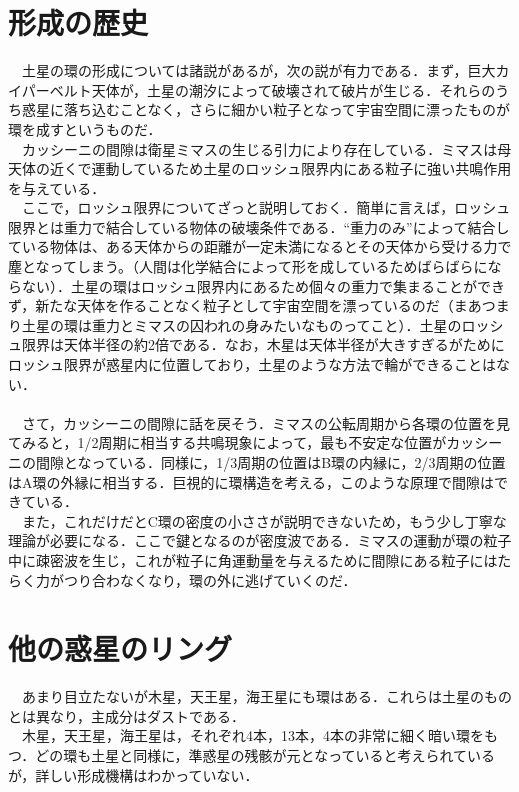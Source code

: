\documentclass[../main]{subfiles}
\begin{document}
\section{形成の歴史}
　土星の環の形成については諸説があるが，次の説が有力である．まず，巨大カイパーベルト天体が，土星の潮汐によって破壊されて破片が生じる．それらのうち惑星に落ち込むことなく，さらに細かい粒子となって宇宙空間に漂ったものが環を成すというものだ．\\
　カッシーニの間隙は衛星ミマスの生じる引力により存在している．ミマスは母天体の近くで運動しているため土星のロッシュ限界内にある粒子に強い共鳴作用を与えている．\\
　ここで，ロッシュ限界についてざっと説明しておく．簡単に言えば，ロッシュ限界とは重力で結合している物体の破壊条件である．``重力のみ''によって結合している物体は、ある天体からの距離が一定未満になるとその天体から受ける力で塵となってしまう。（人間は化学結合によって形を成しているためばらばらにならない）．土星の環はロッシュ限界内にあるため個々の重力で集まることができず，新たな天体を作ることなく粒子として宇宙空間を漂っているのだ（まあつまり土星の環は重力とミマスの囚われの身みたいなものってこと）．土星のロッシュ限界は天体半径の約2倍である．なお，木星は天体半径が大きすぎるがためにロッシュ限界が惑星内に位置しており，土星のような方法で輪ができることはない．
\\\\
　さて，カッシーニの間隙に話を戻そう．ミマスの公転周期から各環の位置を見てみると，1/2周期に相当する共鳴現象によって，最も不安定な位置がカッシーニの間隙となっている．同様に，1/3周期の位置はB環の内縁に，2/3周期の位置はA環の外縁に相当する．巨視的に環構造を考える，このような原理で間隙はできている．\\
　また，これだけだとC環の密度の小ささが説明できないため，もう少し丁寧な理論が必要になる．ここで鍵となるのが密度波である．ミマスの運動が環の粒子中に疎密波を生じ，これが粒子に角運動量を与えるために間隙にある粒子にはたらく力がつり合わなくなり，環の外に逃げていくのだ．


\section{他の惑星のリング}
　あまり目立たないが木星，天王星，海王星にも環はある．これらは土星のものとは異なり，主成分はダストである．\\
　木星，天王星，海王星は，それぞれ4本，13本，4本の非常に細く暗い環をもつ．どの環も土星と同様に，準惑星の残骸が元となっていると考えられているが，詳しい形成機構はわかっていない．
\end{document}
